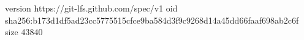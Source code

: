 version https://git-lfs.github.com/spec/v1
oid sha256:b173d1df5ad23cc5775515cfce9ba584d3f9c9268d14a45dd66faaf698ab2c6f
size 43840
